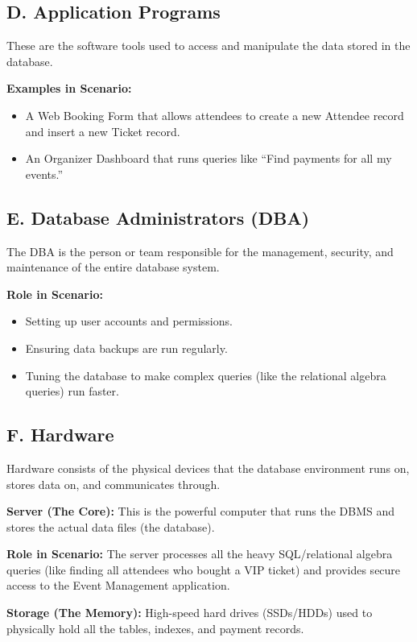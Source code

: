 \documentclass[12pt]{article}
\begin{document}
\subsection*{D. Application Programs}
These are the software tools used to access and manipulate the data stored in the database.

\textbf{Examples in Scenario:}
\begin{itemize}[noitemsep]
    \item A Web Booking Form that allows attendees to create a new Attendee record and insert a new Ticket record.
    \item An Organizer Dashboard that runs queries like ``Find payments for all my events.''
\end{itemize}

\subsection*{E. Database Administrators (DBA)}
The DBA is the person or team responsible for the management, security, and maintenance of the entire database system.

\textbf{Role in Scenario:}
\begin{itemize}[noitemsep]
    \item Setting up user accounts and permissions.
    \item Ensuring data backups are run regularly.
    \item Tuning the database to make complex queries (like the relational algebra queries) run faster.
\end{itemize}

\subsection*{F. Hardware}
Hardware consists of the physical devices that the database environment runs on, stores data on, and communicates through.

\textbf{Server (The Core):} This is the powerful computer that runs the DBMS and stores the actual data files (the database).

\textbf{Role in Scenario:} The server processes all the heavy SQL/relational algebra queries (like finding all attendees who bought a VIP ticket) and provides secure access to the Event Management application.

\textbf{Storage (The Memory):} High-speed hard drives (SSDs/HDDs) used to physically hold all the tables, indexes, and payment records.
\end{document}
